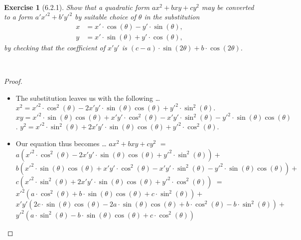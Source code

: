 \documentclass[12pt]{article}
\newcommand{\XB}{\color{black}}
\newcommand{\XBB}{\color{blue}}
\newcommand{\ds}{\displaystyle}
\theoremstyle{plain}
\newtheorem{ex}{Exercise}
\begin{document}
\XBB\hrulefill\XB \\
\begin{ex} [6.2.1]
  Show that a \emph{quadratic form} $ \ds ax^{2} + bxy + cy^{2} $ may be converted to a form 
  $ \ds a'x'^{2} + b'y'^{2} $ by suitable choice of $ \theta $ in the substitution
  \begin{align*}
    x &= x' \cdot \cos(\theta) - y' \cdot \sin(\theta), \\
    y &= x' \cdot \sin(\theta) + y' \cdot \cos(\theta),
  \end{align*}
  by checking that the coefficient of $ x' y' $ is $ (c - a) \cdot \sin(2\theta) + b \cdot \cos(2\theta) $.
\end{ex}
\XBB\hrulefill\XB \\

\begin{proof}
  \ \\

  \begin{itemize}
    \item The substitution leaves us with the following \dots
    \subitem $ \ds x^{2} = x'^{2} \cdot \cos^{2}(\theta) - 2 x'y' \cdot \sin(\theta) \cos(\theta) + y'^{2} \cdot \sin^{2}(\theta) $.
    \subitem $ \ds xy = x'^{2} \cdot \sin(\theta) \cos(\theta) + x'y' \cdot \cos^{2}(\theta) - x'y' \cdot \sin^{2}(\theta) - y'^{2} \cdot \sin(\theta) \cos(\theta) $.
    \subitem $ \ds y^{2} = x'^{2} \cdot \sin^{2}(\theta) + 2 x'y' \cdot \sin(\theta) \cos(\theta) + y'^{2} \cdot \cos^{2}(\theta) $.
    \item Our equation thus becomes \dots
    \subitem $ \ds ax^{2} + bxy + cy^{2} $
    \subitem $ \ds = $
    \subitem $ \ds a ( x'^{2} \cdot \cos^{2}(\theta) - 2 x'y' \cdot \sin(\theta) \cos(\theta) + y'^{2} \cdot \sin^{2}(\theta) ) + $
    \subitem $ \ds b ( x'^{2} \cdot \sin(\theta) \cos(\theta) + x'y' \cdot \cos^{2}(\theta) - x'y' \cdot \sin^{2}(\theta) - y'^{2} \cdot \sin(\theta) \cos(\theta) ) + $
    \subitem $ \ds c ( x'^{2} \cdot \sin^{2}(\theta) + 2 x'y' \cdot \sin(\theta) \cos(\theta) + y'^{2} \cdot \cos^{2}(\theta) ) $
    \subitem $ \ds = $
    \subitem $ \ds x'^{2} ( a \cdot \cos^{2}(\theta) + b \cdot \sin(\theta) \cos(\theta) + c \cdot \sin^{2}(\theta) ) + $
    \subitem $ \ds x'y' ( 2c \cdot \sin(\theta) \cos(\theta) - 2a \cdot \sin(\theta) \cos(\theta) + b \cdot \cos^{2}(\theta) - b \cdot \sin^{2}(\theta)) + $
    \subitem $ \ds y'^{2} ( a \cdot \sin^{2}(\theta) - b \cdot \sin(\theta) \cos(\theta) + c \cdot \cos^{2}(\theta) ) $
  \end{itemize}


\end{proof}
\end{document}
